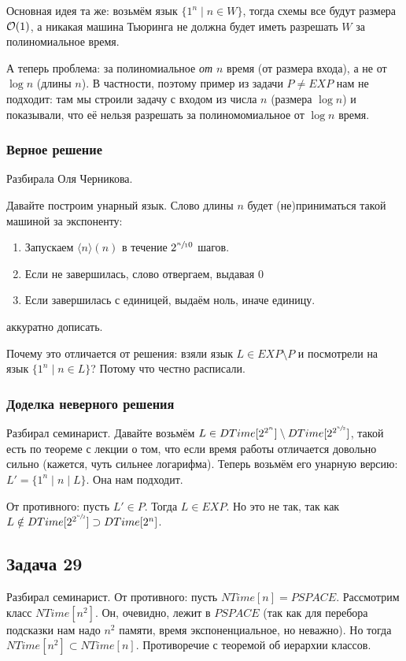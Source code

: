 		Основная идея та же: возьмём язык $\{1^n \mid n \in W\}$, тогда схемы все будут размера $\mathcal O(1)$,
		а никакая машина Тьюринга не должна будет иметь разрешать $W$ за полиномиальное время.

		А теперь проблема: за полиномиальное \textit{от $n$} время (от размера входа),
		а не от $\log n$ (длины $n$).
		В частности, поэтому пример из задачи $P \neq EXP$ нам не подходит:
		там мы строили задачу с входом из числа $n$ (размера $\log n$) и показывали,
		что её нельзя разрешать за полиномомиальное от $\log n$ время.

	\subsubsection{Верное решение}
		Разбирала Оля Черникова.

		Давайте построим унарный язык.
		Слово длины $n$ будет (не)приниматься такой машиной за экспоненту:
		\begin{enumerate}
			\item
				Запускаем $\langle n \rangle (n)$ в течение $2^{\sfrac n 10}$ шагов.
			\item
				Если не завершилась, слово отвергаем, выдавая 0
			\item
				Если завершилась с единицей, выдаём ноль, иначе единицу.
		\end{enumerate}
		\TODO аккуратно дописать.

		\begin{Rem}
			\TODO Почему это отличается от решения: взяли язык $L \in EXP \setminus P$ и посмотрели на язык $\{1^n \mid n \in L\}$?
			Потому что честно расписали.
		\end{Rem}

	\subsubsection{Доделка неверного решения}
		Разбирал семинарист.
		Давайте возьмём $L \in DTime[2^{2^n}] \setminus DTime[2^{2^{\sfrac n2}}]$,
		такой есть по теореме с лекции о том, что если время работы отличается довольно
		сильно (кажется, чуть сильнее логарифма).
		Теперь возьмём его унарную версию: $L' = \{ 1^n \mid n \mid L\}$.
		Она нам подходит.

		От противного: пусть $L' \in P$.
		Тогда $L \in EXP$.
		Но это не так, так как $L \notin DTime[2^{2^{\sfrac n2}}] \supset DTime[2^n]$.
		\TODO

\subsection{Задача 29}
	Разбирал семинарист.
	От противного: пусть $NTime[n] = PSPACE$.
	Рассмотрим класс $NTime[n^2]$.
	Он, очевидно, лежит в $PSPACE$ (так как для перебора подсказки нам надо $n^2$
	памяти, время экспоненциальное, но неважно).
	Но тогда $NTime[n^2] \subset NTime[n]$.
	Противоречие с теоремой об иерархии классов.

